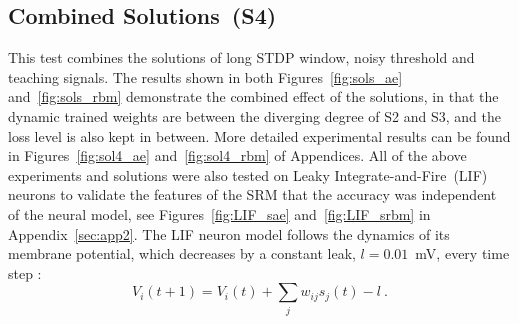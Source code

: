 \subsection{Combined Solutions~(S4)}
This test combines the solutions of long STDP window, noisy threshold and teaching signals.
The results shown in both Figures~\ref{fig:sols_ae} and~\ref{fig:sols_rbm} demonstrate the combined effect of the solutions, in that the dynamic trained weights are between the diverging degree of S2 and S3, and the loss level is also kept in between.
More detailed experimental results can be found in Figures~\ref{fig:sol4_ae} and~\ref{fig:sol4_rbm} of Appendices.
All of the above experiments and solutions were also tested on Leaky Integrate-and-Fire~(LIF) neurons to validate the features of the SRM that the accuracy was independent of the neural model, see Figures~\ref{fig:LIF_sae} and~\ref{fig:LIF_srbm} in Appendix~\ref{sec:app2}.
The LIF neuron model follows the dynamics of its membrane potential, which decreases by a constant leak, $l=0.01$~mV, every time step :
\begin{equation}
V_i(t+1)=V_i(t) + \sum_j w_{ij} s_j(t) - l~.
\end{equation}
